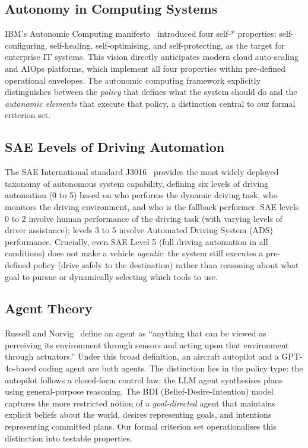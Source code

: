 \documentclass[12pt, a4paper]{article}
\begin{document}
\subsection{Autonomy in Computing Systems}
IBM's Autonomic Computing manifesto~\citep{kephart2003autonomic} introduced four self-* properties: self-configuring, self-healing, self-optimising, and self-protecting, as the target for enterprise IT systems. This vision directly anticipates modern cloud auto-scaling and AIOps platforms, which implement all four properties within pre-defined operational envelopes. The autonomic computing framework explicitly distinguishes between the \emph{policy} that defines what the system should do and the \emph{autonomic elements} that execute that policy, a distinction central to our formal criterion set.

\subsection{SAE Levels of Driving Automation}
The SAE International standard J3016~\citep{sae2021j3016} provides the most widely deployed taxonomy of autonomous system capability, defining six levels of driving automation (0 to 5) based on who performs the dynamic driving task, who monitors the driving environment, and who is the fallback performer. SAE levels 0 to 2 involve human performance of the driving task (with varying levels of driver assistance); levels 3 to 5 involve Automated Driving System (ADS) performance. Crucially, even SAE Level 5 (full driving automation in all conditions) does not make a vehicle \emph{agentic}: the system still executes a pre-defined policy (drive safely to the destination) rather than reasoning about what goal to pursue or dynamically selecting which tools to use.

\subsection{Agent Theory}
Russell and Norvig~\citep{russell2021artificial} define an agent as ``anything that can be viewed as perceiving its environment through sensors and acting upon that environment through actuators.'' Under this broad definition, an aircraft autopilot and a GPT-4o-based coding agent are both agents. The distinction lies in the policy type: the autopilot follows a closed-form control law; the LLM agent synthesises plans using general-purpose reasoning. The BDI (Belief-Desire-Intention) model~\citep{rao1995bdi} captures the more restricted notion of a \emph{goal-directed} agent that maintains explicit beliefs about the world, desires representing goals, and intentions representing committed plans. Our formal criterion set operationalises this distinction into testable properties.
\end{document}
